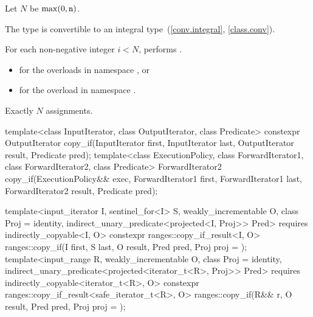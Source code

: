 \begin{itemdescr}
\pnum
Let $N$ be $\max(0, \texttt{n})$.

\pnum
\mandates
The type  is convertible
to an integral type~(\ref{conv.integral}, \ref{class.conv}).

\pnum
\effects
For each non-negative integer $i < N$,
performs .

\pnum
\returns
\begin{itemize}
\item
  for the overloads in namespace , or
\item
  for the overload in namespace .
\end{itemize}

\pnum
\complexity
Exactly $N$ assignments.
\end{itemdescr}

%
\begin{itemdecl}
template<class InputIterator, class OutputIterator, class Predicate>
  constexpr OutputIterator copy_if(InputIterator first, InputIterator last,
                                   OutputIterator result, Predicate pred);
template<class ExecutionPolicy, class ForwardIterator1, class ForwardIterator2,
         class Predicate>
  ForwardIterator2 copy_if(ExecutionPolicy&& exec,
                           ForwardIterator1 first, ForwardIterator1 last,
                           ForwardIterator2 result, Predicate pred);

template<input_iterator I, sentinel_for<I> S, weakly_incrementable O, class Proj = identity,
         indirect_unary_predicate<projected<I, Proj>> Pred>
  requires indirectly_copyable<I, O>
  constexpr ranges::copy_if_result<I, O>
    ranges::copy_if(I first, S last, O result, Pred pred, Proj proj = {});
template<input_range R, weakly_incrementable O, class Proj = identity,
         indirect_unary_predicate<projected<iterator_t<R>, Proj>> Pred>
  requires indirectly_copyable<iterator_t<R>, O>
  constexpr ranges::copy_if_result<safe_iterator_t<R>, O>
    ranges::copy_if(R&& r, O result, Pred pred, Proj proj = {});
\end{itemdecl}


